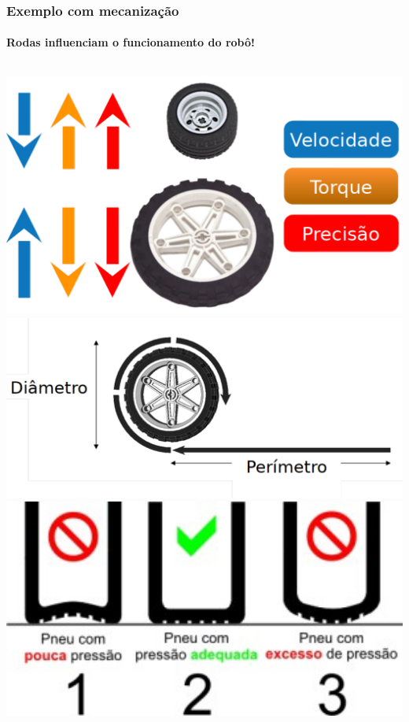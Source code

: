 \documentclass{beamer}
\begin{document}
\begin{frame}
\frametitle{Exemplo com mecanização}
\framesubtitle{Rodas influenciam o funcionamento do robô!}
	\begin{columns}
	   \includegraphics[width=1\textwidth]{imagens/escolha_roda_tamanho}
       	\includegraphics[width=1\textwidth]{imagens/escolha_roda_perimetro}
       	\includegraphics[width=1\textwidth]{imagens/pressao_pneu_inadequado}
    \end{columns}
\end{frame}
\end{document}
